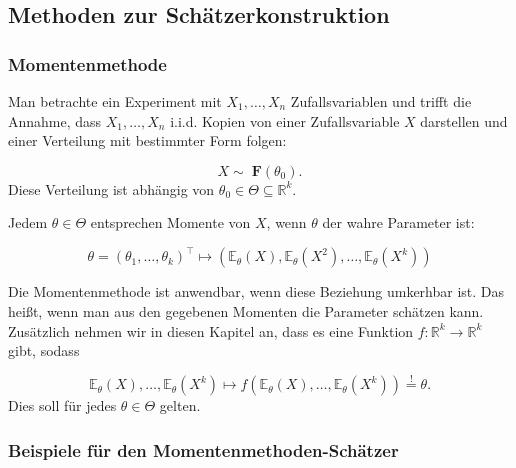 \documentclass[10pt]{article}
\newcommand{\FZV}{X_1, \ldots, X_n} %
\newcommand{\IR}{\mathbb{R}} %
\newcommand{\EW}{\mathbb{E}} %
\begin{document}
\subsection{Methoden zur Schätzerkonstruktion}
\subsubsection{Momentenmethode}

Man betrachte ein Experiment mit $\FZV$ Zufallsvariablen und trifft die Annahme, dass $\FZV$ i.i.d. Kopien von einer Zufallsvariable $X$ darstellen und einer Verteilung mit bestimmter Form folgen:

\vspace{-2mm}
\begin{equation*}
	X \sim \; \textbf{F}(\theta_0).
\end{equation*}
Diese Verteilung ist abhängig von $\theta_0 \in \Theta \subseteq \IR^k$.

\noindent Jedem $\theta \in \Theta$ entsprechen Momente von $X$, wenn $\theta$ der wahre Parameter ist: 

\begin{equation*}
	\theta = (\theta_1, \ldots, \theta_k)^\top \mapsto (\EW_\theta(X), \EW_\theta(X^2),\ldots,\EW_\theta(X^k))
\end{equation*}

\noindent Die Momentenmethode ist anwendbar, wenn diese Beziehung umkerhbar ist. Das heißt, wenn man aus den gegebenen Momenten die Parameter schätzen kann. Zusätzlich nehmen wir in diesen Kapitel an, dass es eine Funktion $f: \IR^k \rightarrow \IR^k$ gibt, sodass 

\begin{equation*}
	\EW_\theta(X),\ldots,\EW_\theta(X^k) \mapsto f(\EW_\theta(X),\ldots,\EW_\theta(X^k)) \overset{!}= \theta.
\end{equation*}
Dies soll für jedes $\theta \in \Theta$ gelten.

\subsubsection{Beispiele für den Momentenmethoden-Schätzer}
\end{document}
